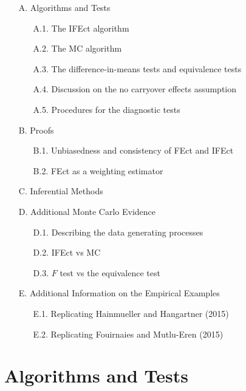 \documentclass[12pt]{article}
\begin{document}
{\bf
\begin{enumerate}\itemsep0ex
    \item[A.] Algorithms and Tests
    \begin{enumerate}\itemsep0ex\vspace{-0.5em}
    	\item[A.1.] The IFEct algorithm
      \item[A.2.] The MC algorithm
    	\item[A.3.] The difference-in-means tests and equivalence tests
      \item[A.4.] Discussion on the no carryover effects assumption
      \item[A.5.] Procedures for the diagnostic tests
	  \end{enumerate}
    \item[B.] Proofs 
    \begin{enumerate}\itemsep0ex\vspace{-0.5em}
      \item[B.1.] Unbiasedness and consistency of FEct and IFEct
      \item[B.2.] FEct as a weighting estimator
    \end{enumerate}
    \item[C.] Inferential Methods
    \item[D.] Additional Monte Carlo Evidence
    \begin{enumerate}\itemsep0ex\vspace{-0.5em}
    \item[D.1.] Describing the data generating processes
    \item[D.2.] IFEct vs MC
    \item[D.3.] $F$ test vs the equivalence test
    \end{enumerate}
    \item[E.] Additional Information on the Empirical Examples
    \begin{enumerate}\itemsep0ex\vspace{-0.5em}
    \item[E.1.] Replicating Hainmueller and Hangartner (2015)
    \item[E.2.] Replicating Fouirnaies and Mutlu-Eren (2015)
    \end{enumerate}    
\end{enumerate}
}
\clearpage

\small



\newpage

\section{Algorithms and Tests}
\end{document}
